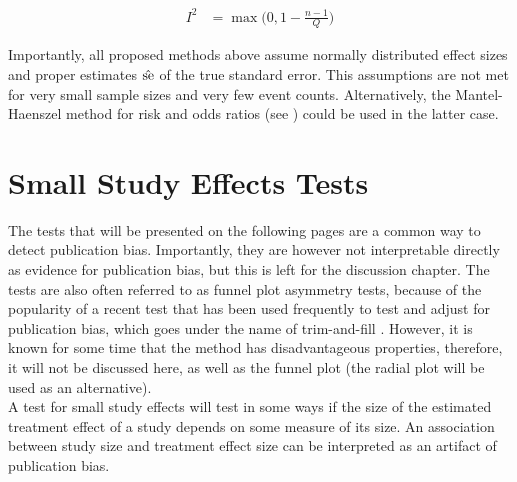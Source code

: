 \documentclass[11pt,a4paper,twoside]{book}\usepackage[]{graphicx}\usepackage[]{color}
\begin{document}
\begin{align}
I^2 &= \max\Big(0, 1 - \frac{n-1}{Q}\Big) \nonumber%
\end{align}

Importantly, all proposed methods above assume normally distributed effect sizes and proper estimates $\hat{\operatorname{se}}$ of the true standard error. This assumptions are not met for very small sample sizes and very few event counts. Alternatively, the Mantel-Haenszel method for risk and odds ratios (see \eg \citet{mantel.haenszel}) could be used in the latter case. 










\section{Small Study Effects Tests}
The tests that will be presented on the following pages are a common way to detect publication bias. Importantly, they are however not interpretable directly as evidence for publication bias, but this is left for the discussion chapter. The tests are also often referred to as funnel plot asymmetry tests, because of the popularity of a recent test that has been used frequently to test and adjust for publication bias, which goes under the name of trim-and-fill \citep{trimfill}. However, it is known for some time that the method has disadvantageous properties, therefore, it will not be discussed here, as well as the funnel plot (the radial plot will be used as an alternative).\\
A test for small study effects will test in some ways if the size of the estimated treatment effect of a study depends on some measure of its size. An association between study size and treatment effect size can be interpreted as an artifact of publication bias.
\end{document}
